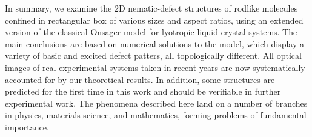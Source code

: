 \documentclass[prl,twocolumn,preprintnumbers,reprint]{revtex4}
\newcommand*{\citen}{}%
\DeclareRobustCommand*{\citen}[1]{%
  \begingroup
    \romannumeral-`\x %
    \setcitestyle{numbers}%
    \cite{#1}%
  \endgroup
}
\begin{document}



In summary, we examine the 2D nematic-defect structures of rodlike molecules confined in rectangular box of various sizes and aspect ratios, using an extended version of the classical Onsager model for lyotropic liquid crystal systems. The main conclusions are based on numerical solutions to the model, which display a variety of basic and excited defect patters, all topologically different.
All optical images of real experimental systems taken in recent years are now systematically accounted for by our theoretical results. In addition, some structures are predicted for the first time in this work and should be verifiable in further experimental work.
The phenomena described here land on a number of branches in physics, materials science, and mathematics, forming problems of fundamental importance.


\end{document}
